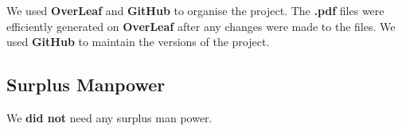 We used \textbf{OverLeaf} and \textbf{GitHub} to organise the project. The \textbf{.pdf} files were efficiently generated on \textbf{OverLeaf} after any changes were made to the files. We used \textbf{GitHub} to maintain the versions of the project. 


\subsection{Surplus Manpower}
We \textbf{did not} need any surplus man power.
